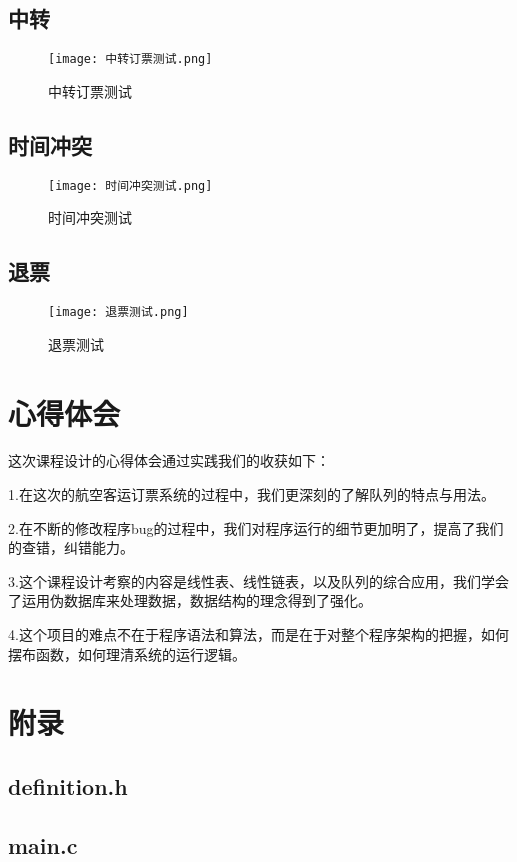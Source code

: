 \documentclass{DateStructure}
\begin{document}
\subsection{中转}
\begin{figure}[H] 
\centering
\texttt{[image: 中转订票测试.png]}
\caption{中转订票测试}	
\end{figure}
\subsection{时间冲突}
\begin{figure}[H] 
\centering
\texttt{[image: 时间冲突测试.png]}
\caption{时间冲突测试}	
\end{figure}
\subsection{退票}
\begin{figure}[H] 
\centering
\texttt{[image: 退票测试.png]}
\caption{退票测试}	
\end{figure}

\section{心得体会}
这次课程设计的心得体会通过实践我们的收获如下：\par
1.在这次的航空客运订票系统的过程中，我们更深刻的了解队列的特点与用法。\par
2.在不断的修改程序bug的过程中，我们对程序运行的细节更加明了，提高了我们的查错，纠错能力。\par
3.这个课程设计考察的内容是线性表、线性链表，以及队列的综合应用，我们学会了运用伪数据库来处理数据，数据结构的理念得到了强化。\par
4.这个项目的难点不在于程序语法和算法，而是在于对整个程序架构的把握，如何摆布函数，如何理清系统的运行逻辑。\par

\newpage 
\section{附录}
\subsection{definition.h}

\subsection{main.c}

\end{document}
